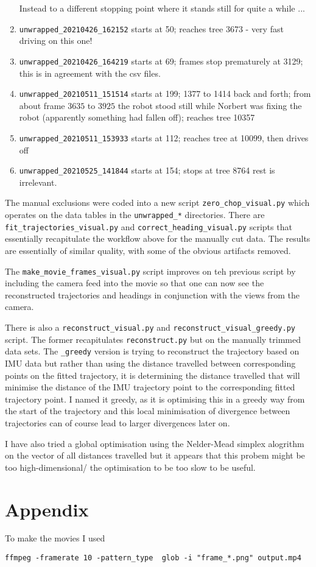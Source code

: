 \documentclass[a4]{article}
\begin{document}
\begin{enumerate}
Instead to a different stopping point where it stands still for quite a
while ...
  \item
\verb+unwrapped_20210426_162152+ starts at 50; reaches tree 3673 -
very fast driving on this one!
  \item
\verb+unwrapped_20210426_164219+ starts at 69; frames stop prematurely
at 3129; this is in agreement with the csv files.
  \item
\verb+unwrapped_20210511_151514+ starts at 199; 1377 to 1414 back and
forth; from about frame $3635$ to $3925$ the robot stood still while
Norbert was fixing the robot (apparently something had fallen off);
reaches tree 10357 
  \item
\verb+unwrapped_20210511_153933+ starts at 112; reaches tree at 10099,
then drives off
  \item
\verb+unwrapped_20210525_141844+ starts at 154; stops at tree 8764
rest is irrelevant.
\end{enumerate}

The manual exclusions were coded into a new script
\verb+zero_chop_visual.py+ which operates on the data tables in the
\verb+unwrapped_*+ directories. There are
\verb+fit_trajectories_visual.py+ and \verb+correct_heading_visual.py+
scripts that essentially recapitulate the workflow above for the
manually cut data. The results are essentially of similar quality,
with some of the obvious artifacts removed.

The \verb+make_movie_frames_visual.py+ script improves on teh previous
script by including the camera feed into the movie so that one can now
see the reconstructed trajectories and headings in conjunction with
the views from the camera.

There is also a \verb+reconstruct_visual.py+ and
\verb+reconstruct_visual_greedy.py+ script. The former recapitulates
\verb+reconstruct.py+ but on the manually trimmed data sets. The
\verb+_greedy+ version is trying to reconstruct the trajectory based
on IMU data but rather than using the distance travelled between
corresponding points on the fitted trajectory, it is determining the
distance travelled that will minimise the distance of the IMU
trajectory point to the corresponding fitted trajectory point. I named
it greedy, as it is optimising this in a greedy way from the start of
the trajectory and this local minimisation of divergence between
trajectories can of course lead to larger divergences later on.

I have also tried a global optimisation using the Nelder-Mead simplex
alogrithm on the vector of all distances travelled but it appears that
this probem might be too high-dimensional/ the optimisation to be too
slow to be useful.



\section{Appendix}
To make the movies I used
\begin{verbatim}
ffmpeg -framerate 10 -pattern_type  glob -i "frame_*.png" output.mp4
\end{verbatim}
\end{document}
